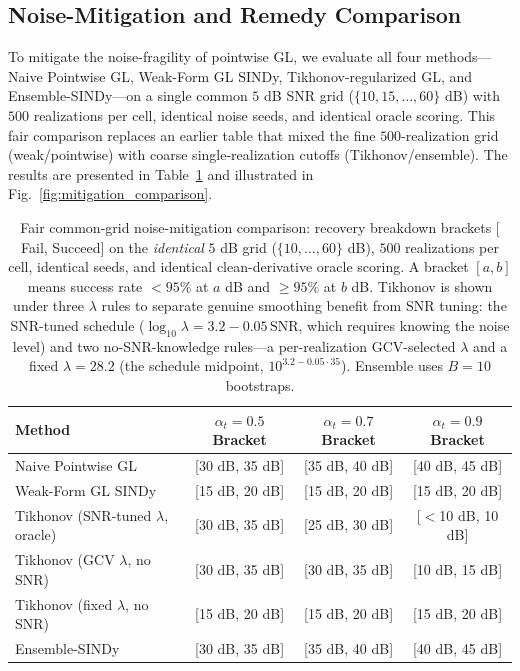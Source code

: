 \documentclass[review,3p,times]{elsarticle}
\begin{document}
\subsection{Noise-Mitigation and Remedy Comparison}
To mitigate the noise-fragility of pointwise GL, we evaluate all four methods---Naive Pointwise GL, Weak-Form GL SINDy, Tikhonov-regularized GL, and Ensemble-SINDy---on a single common $5$ dB SNR grid ($\{10,15,\dots,60\}$ dB) with $500$ realizations per cell, identical noise seeds, and identical oracle scoring. This fair comparison replaces an earlier table that mixed the fine $500$-realization grid (weak/pointwise) with coarse single-realization cutoffs (Tikhonov/ensemble). The results are presented in Table~\ref{tab:mitigation_comparison} and illustrated in Fig.~\ref{fig:mitigation_comparison}.

\begin{table}[htbp]
\centering
\caption{Fair common-grid noise-mitigation comparison: recovery breakdown brackets $[$Fail, Succeed$]$ on the \emph{identical} $5$ dB grid ($\{10,\dots,60\}$ dB), $500$ realizations per cell, identical seeds, and identical clean-derivative oracle scoring. A bracket $[a,b]$ means success rate $<95\%$ at $a$ dB and $\ge 95\%$ at $b$ dB. Tikhonov is shown under three $\lambda$ rules to separate genuine smoothing benefit from SNR tuning: the SNR-tuned schedule ($\log_{10}\lambda = 3.2 - 0.05\,\mathrm{SNR}$, which requires knowing the noise level) and two no-SNR-knowledge rules---a per-realization GCV-selected $\lambda$ and a fixed $\lambda = 28.2$ (the schedule midpoint, $10^{3.2 - 0.05\cdot35}$). Ensemble uses $B=10$ bootstraps.}
\label{tab:mitigation_comparison}
\begin{tabular}{lccc}
\toprule
Method & $\alpha_t = 0.5$ Bracket & $\alpha_t = 0.7$ Bracket & $\alpha_t = 0.9$ Bracket \\
\midrule
Naive Pointwise GL & [30 dB, 35 dB] & [35 dB, 40 dB] & [40 dB, 45 dB] \\
Weak-Form GL SINDy & [15 dB, 20 dB] & [15 dB, 20 dB] & [15 dB, 20 dB] \\
Tikhonov (SNR-tuned $\lambda$, oracle) & [30 dB, 35 dB] & [25 dB, 30 dB] & [$<$10 dB, 10 dB] \\
Tikhonov (GCV $\lambda$, no SNR) & [30 dB, 35 dB] & [30 dB, 35 dB] & [10 dB, 15 dB] \\
Tikhonov (fixed $\lambda$, no SNR) & [15 dB, 20 dB] & [15 dB, 20 dB] & [15 dB, 20 dB] \\
Ensemble-SINDy & [30 dB, 35 dB] & [35 dB, 40 dB] & [40 dB, 45 dB] \\
\bottomrule
\end{tabular}
\end{table}
\end{document}
